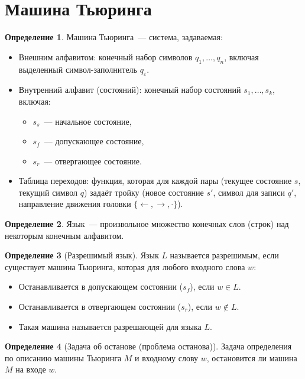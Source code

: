 \documentclass[a4paper,11pt]{article}
\theoremstyle{definition}
\newtheorem*{dfn}{Определение}
\begin{document}
\section{Машина Тьюринга}
\begin{dfn}
Машина Тьюринга~--- система, задаваемая:
\begin{itemize}
\item Внешним алфавитом: конечный набор символов $q_1, \dots, q_n$, включая
  выделенный символ-заполнитель $q_\varepsilon$.
\item Внутренний алфавит (состояний): конечный набор состояний $s_1, \dots,
  s_k$, включая:
  \begin{itemize}
  \item $s_s$~--- начальное состояние,
  \item $s_f$~--- допускающее состояние,
  \item $s_r$~--- отвергающее состояние.
  \end{itemize}
\item Таблица переходов: функция, которая для каждой пары (текущее состояние
  $s$, текущий символ $q$) задаёт тройку (новое состояние $s'$, символ для
  записи $q'$, направление движения головки $\{\leftarrow, \rightarrow,
  \cdot\}$).
\end{itemize}
\end{dfn}
\begin{dfn}
Язык~--- произвольное множество конечных слов (строк) над некоторым конечным
алфавитом.
\end{dfn}
\begin{dfn}[Разрешимый язык]
Язык $L$ называется разрешимым, если существует машина Тьюринга, которая для
любого входного слова $w$:
\begin{itemize}
\item Останавливается в допускающем состоянии ($s_f$), если $w \in L$.
\item Останавливается в отвергающем состоянии ($s_r$), если $w \notin L$.
\item Такая машина называется разрешающей для языка $L$.
\end{itemize}
\end{dfn}
\begin{dfn}[Задача об останове (проблема останова)]
Задача определения по описанию машины Тьюринга $M$ и входному слову $w$,
остановится ли машина $M$ на входе $w$.
\end{dfn}
\end{document}

